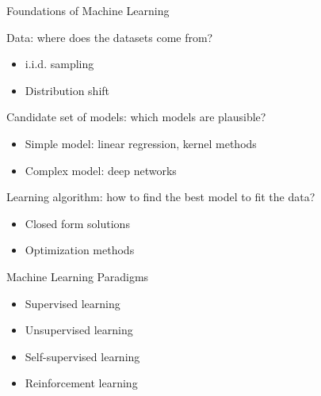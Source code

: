 \documentclass[aspectratio=169,12pt]{beamer}
\begin{document}
\begin{frame}[t]{Foundations of Machine Learning}
	
	
	
	\begin{itemize}
		\vspace{0.5cm}
		{\large
			\setlength{\itemsep}{0.5cm}
			\item Data: where does the datasets come from? 
			\vspace{0.2cm}
			\begin{itemize}
				\item i.i.d. sampling
				\item Distribution shift
			\end{itemize}
			\item Candidate set of models: which models are plausible?
			\vspace{0.2cm}
			\begin{itemize}
				\item Simple model: linear regression, kernel methods
				\item Complex model: deep networks
			\end{itemize}
			\item Learning algorithm: how to find the best model to fit the data?
			\vspace{0.2cm}
			\begin{itemize}
				\item Closed form solutions
				\item Optimization methods
			\end{itemize}
		}
	\end{itemize}
	
	
\end{frame}


\begin{frame}{Machine Learning Paradigms}
	
	{\large
\begin{itemize}
	\setlength{\itemsep}{0.72cm}
	\item Supervised learning
	
	\item Unsupervised learning
	
	\item Self-supervised learning
	
	\item Reinforcement learning
\end{itemize}
}

\end{frame}
\end{document}
